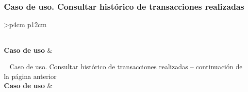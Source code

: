 \subsubsection{Caso de uso. Consultar histórico de transacciones realizadas} \label{sec:cu_transacciones-realizadas}
\begin{longtable}{
    >{}p{4cm}
    p{12cm}
    }
    \caption{Caso de uso. Consultar histórico de transacciones realizadas} \label{table:cu_transacciones-realizadas} \\
    \toprule
    \textbf{Caso de uso} &  \\
    \endfirsthead
    
    {{ \tablename\ \thetable{} Caso de uso. Consultar histórico de transacciones realizadas -- continuación de la página anterior}} \\
    \toprule
    \textbf{Caso de uso} &  \\
    \midrule
    \endhead
    
    \midrule
     \\ 
    \endfoot
    
    \bottomrule
    \endlastfoot
    

\end{longtable}
